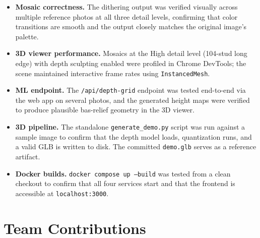 \documentclass[12pt]{article}
\begin{document}
\begin{itemize}[leftmargin=*]
    \item \textbf{Mosaic correctness.} The dithering output was verified visually
          across multiple reference photos at all three detail levels, confirming
          that color transitions are smooth and the output closely matches the
          original image's palette.

    \item \textbf{3D viewer performance.} Mosaics at the High detail level
          (104-stud long edge) with depth sculpting enabled were profiled in
          Chrome DevTools; the scene maintained interactive frame rates using
          \texttt{InstancedMesh}.

    \item \textbf{ML endpoint.} The \texttt{/api/depth-grid} endpoint was tested
          end-to-end via the web app on several photos, and the generated
          height maps were verified to produce plausible bas-relief geometry in
          the 3D viewer.

    \item \textbf{3D pipeline.} The standalone \texttt{generate\_demo.py} script
          was run against a sample image to confirm that the depth model loads,
          quantization runs, and a valid GLB is written to disk. The committed
          \texttt{demo.glb} serves as a reference artifact.

    \item \textbf{Docker builds.} \texttt{docker compose up --build} was tested
          from a clean checkout to confirm that all four services start and
          that the frontend is accessible at \texttt{localhost:3000}.
\end{itemize}

\section{Team Contributions}
\end{document}
